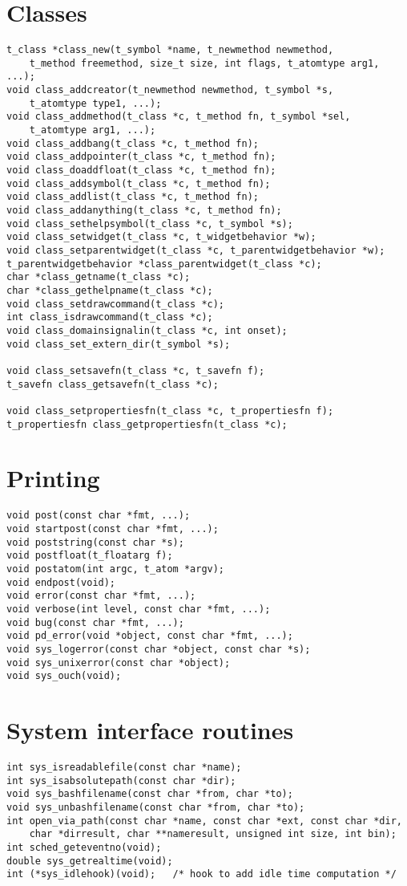 \section{Classes}
\begin{lstlisting}
t_class *class_new(t_symbol *name, t_newmethod newmethod,
    t_method freemethod, size_t size, int flags, t_atomtype arg1, ...);
void class_addcreator(t_newmethod newmethod, t_symbol *s, 
    t_atomtype type1, ...);
void class_addmethod(t_class *c, t_method fn, t_symbol *sel,
    t_atomtype arg1, ...);
void class_addbang(t_class *c, t_method fn);
void class_addpointer(t_class *c, t_method fn);
void class_doaddfloat(t_class *c, t_method fn);
void class_addsymbol(t_class *c, t_method fn);
void class_addlist(t_class *c, t_method fn);
void class_addanything(t_class *c, t_method fn);
void class_sethelpsymbol(t_class *c, t_symbol *s);
void class_setwidget(t_class *c, t_widgetbehavior *w);
void class_setparentwidget(t_class *c, t_parentwidgetbehavior *w);
t_parentwidgetbehavior *class_parentwidget(t_class *c);
char *class_getname(t_class *c);
char *class_gethelpname(t_class *c);
void class_setdrawcommand(t_class *c);
int class_isdrawcommand(t_class *c);
void class_domainsignalin(t_class *c, int onset);
void class_set_extern_dir(t_symbol *s);

void class_setsavefn(t_class *c, t_savefn f);
t_savefn class_getsavefn(t_class *c);

void class_setpropertiesfn(t_class *c, t_propertiesfn f);
t_propertiesfn class_getpropertiesfn(t_class *c);

\end{lstlisting}

\section{Printing}
\begin{lstlisting}
void post(const char *fmt, ...);
void startpost(const char *fmt, ...);
void poststring(const char *s);
void postfloat(t_floatarg f);
void postatom(int argc, t_atom *argv);
void endpost(void);
void error(const char *fmt, ...);
void verbose(int level, const char *fmt, ...);
void bug(const char *fmt, ...);
void pd_error(void *object, const char *fmt, ...);
void sys_logerror(const char *object, const char *s);
void sys_unixerror(const char *object);
void sys_ouch(void);
\end{lstlisting}

\section{System interface routines}
\begin{lstlisting}
int sys_isreadablefile(const char *name);
int sys_isabsolutepath(const char *dir);
void sys_bashfilename(const char *from, char *to);
void sys_unbashfilename(const char *from, char *to);
int open_via_path(const char *name, const char *ext, const char *dir,
    char *dirresult, char **nameresult, unsigned int size, int bin);
int sched_geteventno(void);
double sys_getrealtime(void);
int (*sys_idlehook)(void);   /* hook to add idle time computation */
\end{lstlisting}

